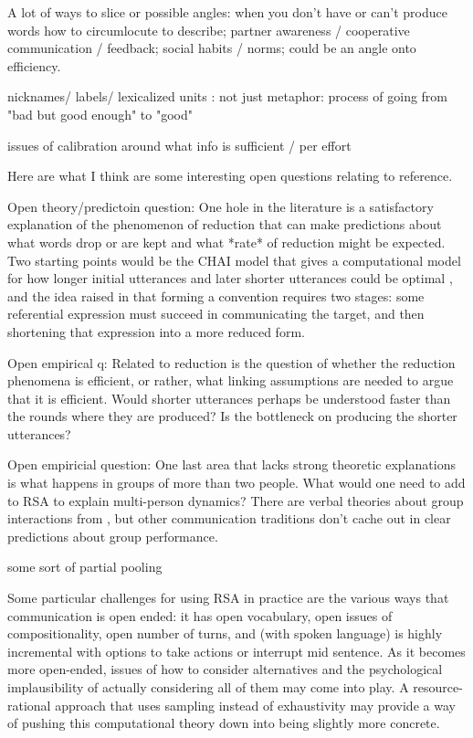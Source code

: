 \documentclass[]{article}
\begin{document}
	A lot of ways to slice or possible angles: when you don't have or can't produce words how to circumlocute to describe; partner awareness / cooperative communication / feedback; social habits / norms; could be an angle onto efficiency. 
	
	nicknames/ labels/ lexicalized units : not just metaphor: process of going from "bad but good enough" to "good"
	
	issues of calibration around what info is sufficient / per effort 
	
	Here are what I think are some interesting open questions relating to reference. 
	
	Open theory/predictoin question: One hole in the literature is a satisfactory explanation of the phenomenon of reduction that can make predictions about what words drop or are kept and what *rate* of reduction might be expected. Two starting points would be the CHAI model that gives a computational model for how longer initial utterances and later shorter utterances could be optimal \cite{hawkins2021}, and the idea raised in \cite{leung2023} that forming a convention requires two stages: some referential expression must succeed in communicating the target, and then shortening that expression into a more reduced form.
	
	Open empirical q: Related to reduction is the question of whether the reduction phenomena is efficient, or rather, what linking assumptions are needed to argue that it is efficient. Would shorter utterances perhaps be understood faster than the rounds where they are produced? Is the bottleneck on producing the shorter utterances? 
	
	Open empiricial question: One last area that lacks strong theoretic explanations is what happens in groups of more than two people. What would one need to add to RSA to explain multi-person dynamics? There are verbal theories about group interactions from \cite{yoon2018}, but other communication traditions don't cache out in clear predictions about group performance. 
	
	some sort of partial pooling 
	
	Some particular challenges for using RSA in practice are the various ways that communication is open ended: it has open vocabulary, open issues of compositionality, open number of turns, and (with spoken language) is highly incremental with options to take actions or interrupt mid sentence. As it becomes more open-ended, issues of how to consider alternatives and the psychological implausibility of actually considering all of them may come into play. A resource-rational approach that uses sampling instead of exhaustivity may provide a way of pushing this computational theory down into being slightly more concrete. 
	
\end{document}
